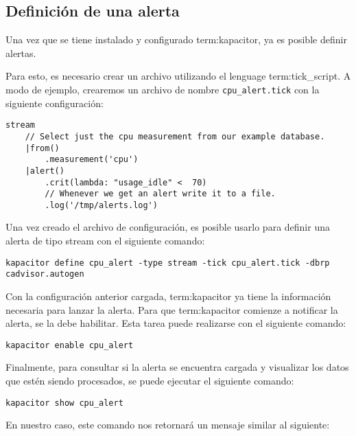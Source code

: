 \subsection{Definición de una alerta}
\label{definir-alerta}

Una vez que se tiene instalado y configurado \gls{term:kapacitor}, ya es
posible definir alertas.

Para esto, es necesario crear un archivo utilizando el lenguage
\gls{term:tick_script}. A modo de ejemplo, crearemos un archivo de nombre
\texttt{cpu\_alert.tick} con la siguiente configuración:

\begin{lstlisting}
stream
    // Select just the cpu measurement from our example database.
    |from()
        .measurement('cpu')
    |alert()
        .crit(lambda: "usage_idle" <  70)
        // Whenever we get an alert write it to a file.
        .log('/tmp/alerts.log')
\end{lstlisting}

Una vez creado el archivo de configuración, es posible usarlo para definir una
alerta de tipo stream con el siguiente comando:

\begin{lstlisting}
kapacitor define cpu_alert -type stream -tick cpu_alert.tick -dbrp cadvisor.autogen
\end{lstlisting}

Con la configuración anterior cargada, \gls{term:kapacitor} ya tiene la
información necesaria para lanzar la alerta. Para que \gls{term:kapacitor}
comienze a notificar la alerta, se la debe habilitar. Esta tarea puede
realizarse con el siguiente comando:

\begin{lstlisting}
kapacitor enable cpu_alert
\end{lstlisting}

Finalmente, para consultar si la alerta se encuentra cargada y visualizar los
datos que estén siendo procesados, se puede ejecutar el siguiente comando:

\begin{lstlisting}
kapacitor show cpu_alert
\end{lstlisting}

En nuestro caso, este comando nos retornará un mensaje similar al siguiente:

